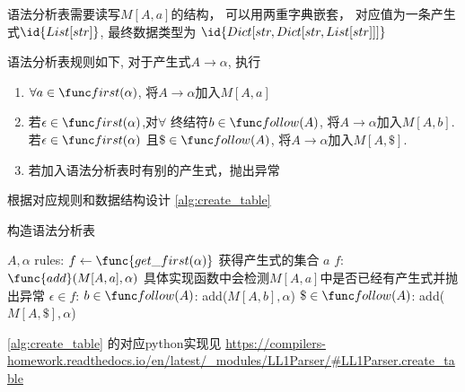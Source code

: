 \documentclass[../report]{subfiles}
\begin{document}
语法分析表需要读写$M[A,a]$的结构，
可以用两重字典嵌套，
对应值为一条产生式$\id{List[str]}$,
最终数据类型为
$\id{Dict[str, Dict[str, List[str]]]}$

语法分析表规则如下,
对于产生式$A \to \alpha$,
执行
\begin{enumerate}
  \item $\forall a \in \first(\alpha)$,
    将$A \to \alpha$加入$M[A,a]$
  \item 若$\epsilon \in \first(\alpha)$,对$\forall$ 终结符$b \in \follow(A)$,
  将$A \to \alpha$加入$M[A,b]$.
  若$\epsilon \in \first(\alpha)$
  且$\$ \in \follow(A)$,
  将$A \to \alpha$加入$M[A,\$]$.
  \item 若加入语法分析表时有别的产生式，抛出异常
\end{enumerate}

根据对应规则和数据结构设计%
\cref{alg:create_table}

\begin{algorithm}[H]
  \caption{构造语法分析表}
  \begin{codebox}
      \li \For $A,\alpha$  rules:
      \Then
        \li $f \gets \func{get\_first(\alpha)}$ \Comment 获得产生式的\first 集合
        \li \For $a$  $f$:
        \Then
          \li $\func{add}(M[A,a],\alpha)$ \Comment 具体实现函数中会检测$M[A,a]$中是否已经有产生式并抛出异常
        \End
        \li \If $\epsilon \in f$:
        \Then
          \li \For $b \in \follow(A)$:
          \Then
            \li add($M[A,b],\alpha$)
          \End
          \li \If $\$ \in \follow(A)$:
          \Then
            \li add($M[A,\$],\alpha$)
          \End
        \End
      \End
  \end{codebox}
  \label{alg:create_table}
\end{algorithm}

\cref{alg:create_table} 的对应python实现见
\url{https://compilers-homework.readthedocs.io/en/latest/_modules/LL1Parser/#LL1Parser.create_table}
\end{document}
